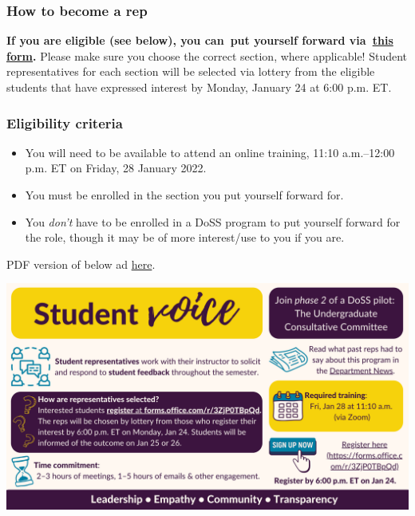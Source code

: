 \documentclass[
  openany]{book}
\begin{document}
\hypertarget{how-to-become-a-rep}{%
\subsubsection{How to become a rep}\label{how-to-become-a-rep}}

\textbf{If you are eligible (see below), you can~put yourself forward via~\href{https://forms.office.com/r/3ZjP0TBpQd}{this form}.} Please make sure you choose the correct section, where applicable! Student representatives for each section will be selected via lottery from the eligible students that have expressed interest by Monday, January 24 at 6:00 p.m. ET.~~

\hypertarget{eligibility-criteria}{%
\subsubsection{Eligibility criteria}\label{eligibility-criteria}}

\begin{itemize}
\item
  You will need to be available to attend an online training, 11:10 a.m.--12:00 p.m. ET on Friday, 28 January 2022.
\item
  You must be enrolled in the section you put yourself forward for.
\item
  You \emph{don't} have to be enrolled in a DoSS program to put yourself forward for the role, though it may be of more interest/use to you if you are.
\end{itemize}

PDF version of below ad \href{https://sta303-bolton.github.io/sta303-w22-courseguide/other-files/student-rep-ad-w22.pdf}{here}.

\includegraphics{images/Student Rep Ad (Winter 2022).png}

  
\end{document}
